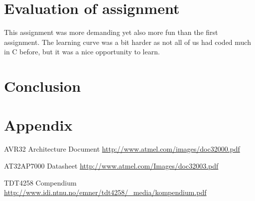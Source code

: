 \documentclass[a4paper,11pt]{article}
\begin{document}
\section{Evaluation of assignment}
This assignment was more demanding yet also more fun than the first assignment. The learning curve was a bit harder as not all of us had coded much in C before, but it was a nice opportunity to learn.

\section{Conclusion}

\section{Appendix}

\footnotesize{  %
\begin{thebibliography}{N}

 AVR32 Architecture Document
\url{http://www.atmel.com/images/doc32000.pdf}

 AT32AP7000 Datasheet
\url{http://www.atmel.com/Images/doc32003.pdf}

 TDT4258 Compendium
\url{http://www.idi.ntnu.no/emner/tdt4258/_media/kompendium.pdf}

\end{thebibliography}  
}
\end{document}
